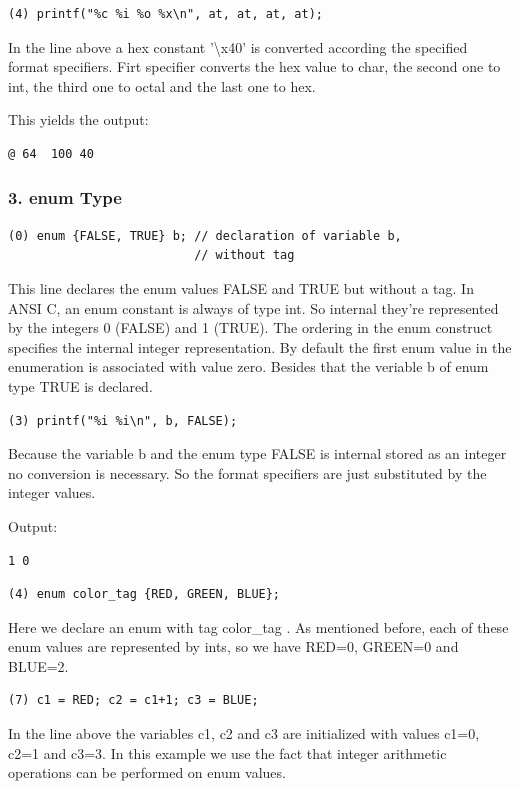 \documentclass[12pt]{article}
\begin{document}
\begin{lstlisting}
(4) printf("%c %i %o %x\n", at, at, at, at);
\end{lstlisting}
In the line above a hex constant '\textbackslash x40' is converted according the specified format specifiers. Firt specifier converts the hex value to char, the second one to int, the third one to octal and the last one to hex. 

This yields the output:
\begin{lstlisting}
@ 64  100 40
\end{lstlisting}


\subsubsection*{3. enum Type}
\begin{lstlisting}
(0) enum {FALSE, TRUE} b; // declaration of variable b,
                          // without tag
\end{lstlisting}
This line declares the enum values FALSE and TRUE but without a tag. In ANSI C, an enum constant is always of type int. So internal they're represented by the integers 0 (FALSE) and 1 (TRUE). The ordering in the enum construct specifies the internal integer representation. By default the first enum value in the enumeration is associated with value zero. Besides that the veriable b of enum type TRUE is declared.
\\
\begin{lstlisting}
(3) printf("%i %i\n", b, FALSE);
\end{lstlisting}
Because the variable b and the enum type FALSE is internal stored as an integer no conversion is necessary. So the format specifiers are just substituted by the integer values.

Output:
\begin{lstlisting}
1 0
\end{lstlisting}

\begin{lstlisting}
(4) enum color_tag {RED, GREEN, BLUE};
\end{lstlisting}

Here we declare an enum with tag color\_tag . As mentioned before, each of these enum values are represented by ints, so we have RED=0, GREEN=0 and BLUE=2.
\\
\begin{lstlisting}
(7) c1 = RED; c2 = c1+1; c3 = BLUE;
\end{lstlisting}
In the line above the variables c1, c2 and c3 are initialized with values c1=0, c2=1 and c3=3. In this example we use the fact that integer arithmetic operations can be performed on enum values.
\end{document}
